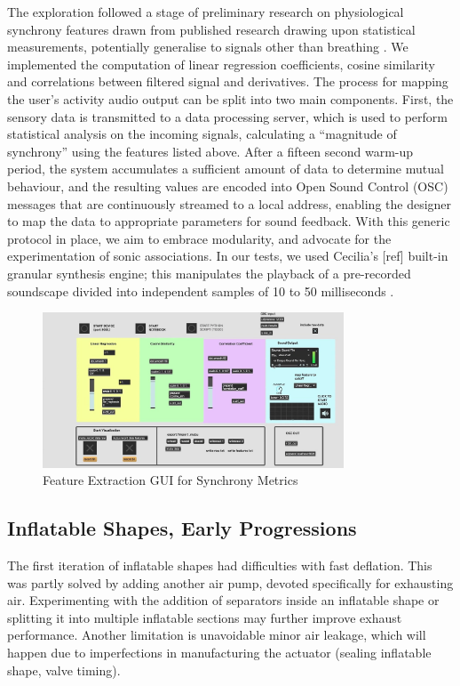 The exploration followed a stage of preliminary research on physiological synchrony features drawn from published research drawing upon statistical measurements, potentially generalise to signals other than breathing \cite{zamm_endogenous_2016}. We implemented the computation of linear regression coefficients, cosine similarity and correlations between filtered signal and derivatives. The process for mapping the user’s activity audio output can be split into two main components. First, the sensory data is transmitted to a data processing server, which is used to perform statistical analysis on the incoming signals, calculating a “magnitude of synchrony” using the features listed above. After a fifteen second warm-up period, the system accumulates a sufficient amount of data to determine mutual behaviour, and the resulting values are encoded into Open Sound Control (OSC) messages that are continuously streamed to a local address, enabling the designer to map the data to appropriate parameters for sound feedback. With this generic protocol in place, we aim to embrace modularity, and advocate for the experimentation of sonic associations. In our tests, we used Cecilia’s [ref] built-in granular synthesis engine; this manipulates the playback of a pre-recorded soundscape divided into independent samples of 10 to 50 milliseconds \cite{roads_introduction_1988}.

\begin{figure}[htbp]
	\centering
	\includegraphics[width=0.8\textwidth]{Chapters/Figures/Feature_Extraction_Sync_MAX.jpg}
	\caption{Feature Extraction GUI for Synchrony Metrics}
	\label{fig:Concept_Venn}
\end{figure}

\subsection{Inflatable Shapes, Early Progressions}

The first iteration of inflatable shapes had difficulties with fast deflation. This was partly solved by adding another air pump, devoted specifically for exhausting air. Experimenting with the addition of separators inside an inflatable shape or splitting it into multiple inflatable sections may further improve exhaust performance. Another limitation is unavoidable minor air leakage, which will happen due to imperfections in manufacturing the actuator (sealing inflatable shape, valve timing).

